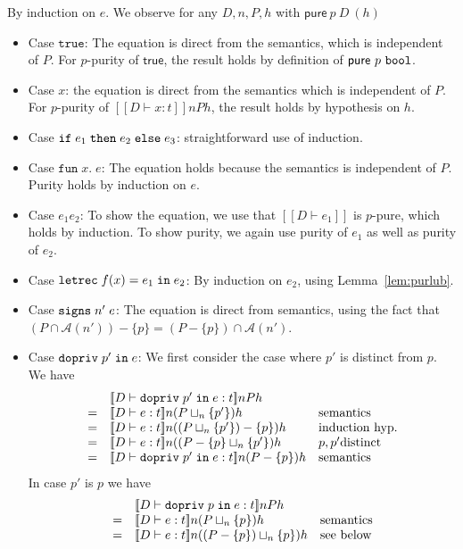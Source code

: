 \documentclass[submission,copyright,creativecommons]{eptcs}
\newcommand{\ifthenelse}[3]{\IF\;#1\;\THEN\;#2\;\ELSE\;#3}
\newcommand{\enable}[2]{\ENABLE\;#1\;\IN\;#2}
\newcommand{\signs}[2]{\SIGNS\;#1\;#2}
\newcommand{\BOOL}{\mbox{\texttt{bool}}}
\newcommand{\ELSE}{\mbox{\texttt{else}}}
\newcommand{\IF}{\mbox{\texttt{if}}}
\newcommand{\IN}{\mbox{\texttt{in}}}
\newcommand{\LET}{\mbox{\texttt{let}}}
\newcommand{\REC}{{\texttt{rec}}}
\newcommand{\THEN}{{\texttt{then}}}
\newcommand{\TRUE}{{\texttt{true}}}
\newcommand{\A}{\mathcal{A}}
\newcommand{\ldb}{[\![}
\newcommand{\rdb}{]\!]}
\newcommand{\means}[1]{\ldb {#1}\rdb}
\newcommand{\intersect}{\cap}
\newcommand{\proves}{\vdash}
\newcommand{\recdecl}[3]{\REC\;#1(#2) = #3}
\newcommand{\ENABLE}{\mbox{\texttt{dopriv}}}
\newcommand{\SIGNS}{\mbox{\texttt{signs}}}
\newcommand{\pure}{\textsf{pure}}
\newcommand{\letdecl}[2]{\LET#1\;\IN\;#2}
\newcommand{\LAM}[2]{{\mathtt{fun}\; #1.\; #2}}
\newcommand{\D}{D} \newcommand{\ty}{t} \renewcommand{\th}{\theta}
\newcommand{\n}{n} \newcommand{\p}{p} \newcommand{\Ps}{\Pi} \newcommand{\h}{h}
\newenvironment{xproof}{\begin{trivlist}\item[\hskip\labelsep{\bf  
Proof:}]}{\end{trivlist}}
\begin{document}
\begin{xproof}
By induction on $e$.  We observe for any $\D,\n,P,\h$ with 
$\pure~\p~\D~(\h)$
\begin{itemize}
\item Case $\TRUE$: The equation is direct from the
 semantics, which is independent of $P$.  For $\p$-purity of $\mathsf{true}$,
the result holds by definition of $\pure~\p~\BOOL$.
\item Case $x$: the equation is direct from the semantics which is independent 
of  $P$.  For $\p$-purity of $\means{D\proves x:t}\n P\h$,
the result holds by hypothesis on $\h$.
\item Case $\ifthenelse{e_1}{e_2}{e_3}$: straightforward use of induction.
\item Case $\LAM{x}{e}$: The equation holds because the semantics is independent of
  $P$.  Purity holds by induction on $e$.  
\item Case $e_1 e_2$: To show the equation, we use that $\means{D\proves e_1}$ is
  $\p$-pure, which holds by induction.  To show purity, we again use purity of
  $e_1$ as well as purity of $e_2$. 
\item Case $\letdecl{\recdecl{f}{x}{e_1}}{e_2}$:
By induction on $e_2$, using Lemma~\ref{lem:purlub}.
\item Case $\signs{\n'}{e}$:
The equation is direct from semantics, using the fact that 
$(P\intersect \A(\n'))-\{\p\} = (P-\{\p\})\intersect \A(\n')$.
\item Case $\enable{\p'}{e}$:  
We first consider the case where $\p'$ is distinct from $\p$.  We have 
\[\begin{array}{cll}
 & \means{\D\proves\enable{\p'}{e}:\ty}\n P \h \\
= & \means{\D\proves e:\ty}\n (P\sqcup_{\n} \{\p'\} ) \h& \mbox{semantics}\\
= & \means{\D\proves e:\ty}\n ((P\sqcup_{\n} \{\p'\} )-\{\p\}) \h & \mbox{induction hyp.}\\
= & \means{\D\proves e:\ty}\n ((P-\{\p\}\sqcup_{\n} \{\p'\} ) \h & \p,\p'\mbox{distinct}\\
= & \means{\D\proves\enable{\p'}{e}:\ty}\n (P-\{\p\}) \h& \mbox{semantics}
\end{array} \]
In case $\p'$ is $\p$ we have
\[\begin{array}{cll}
 & \means{\D\proves\enable{\p}{e}:\ty}\n P \h\\
= & \means{\D\proves e:\ty}\n (P\sqcup_{\n} \{\p\} ) \h& \mbox{semantics}\\
= & \means{\D\proves e:\ty}\n ((P-\{\p\}) \sqcup_{\n} \{\p\} ) \h&\mbox{see below}\\

\end{array}\]
\end{itemize}
\end{xproof}
\end{document}
